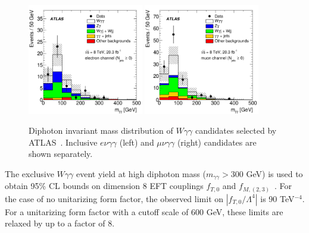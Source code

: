 \begin{figure}[p]
    \centering
    \includegraphics[width=0.45\textwidth]{figures/ss-inclboson-triboson-wgg-ele-atlas8tev.pdf}
    \includegraphics[width=0.45\textwidth]{figures/ss-inclboson-triboson-wgg-mu-atlas8tev.pdf}
    \caption{Diphoton invariant mass distribution of $W\gamma\gamma$ candidates selected by ATLAS~\cite{Aad:2015uqa}.  Inclusive $e\nu\gamma\gamma$ (left) and $\mu\nu\gamma\gamma$ (right) candidates are shown separately.}
    \label{fig:ss-inclboson-triboson-wgg-atlas8tev}
\end{figure}

The exclusive $W\gamma\gamma$ event yield at high diphoton mass
($m_{\gamma\gamma} > 300$ GeV) is used to obtain 95\% CL bounds on
dimension 8 EFT couplings $f_{T,0}$ and
$f_{M,(2,3)}$~\cite{Eboli:2006wa}.  For the case of no unitarizing
form factor, the observed limit on $|f_{T,0}/\Lambda^4|$ is 90
TeV$^{-4}$.  For a unitarizing form factor with a cutoff scale of 600
GeV, these limits are relaxed by up to a factor of 8.

